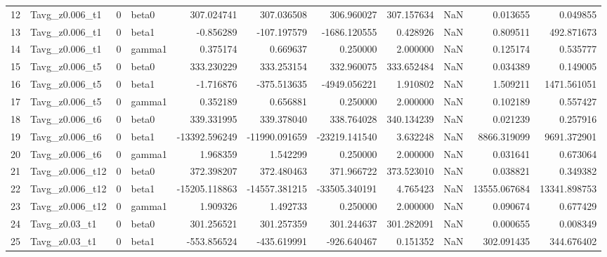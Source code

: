 \begin{tabular}{llrlrrrrrrr}
12 &    Tavg_z0.006_t1 &       0 &     beta0 &    307.024741 &    307.036508 &    306.960027 &   307.157634 &      NaN &      0.013655 &      0.049855 \\
13 &    Tavg_z0.006_t1 &       0 &     beta1 &     -0.856289 &   -107.197579 &  -1686.120555 &     0.428926 &      NaN &      0.809511 &    492.871673 \\
14 &    Tavg_z0.006_t1 &       0 &    gamma1 &      0.375174 &      0.669637 &      0.250000 &     2.000000 &      NaN &      0.125174 &      0.535777 \\
15 &    Tavg_z0.006_t5 &       0 &     beta0 &    333.230229 &    333.253154 &    332.960075 &   333.652484 &      NaN &      0.034389 &      0.149005 \\
16 &    Tavg_z0.006_t5 &       0 &     beta1 &     -1.716876 &   -375.513635 &  -4949.056221 &     1.910802 &      NaN &      1.509211 &   1471.561051 \\
17 &    Tavg_z0.006_t5 &       0 &    gamma1 &      0.352189 &      0.656881 &      0.250000 &     2.000000 &      NaN &      0.102189 &      0.557427 \\
18 &    Tavg_z0.006_t6 &       0 &     beta0 &    339.331995 &    339.378040 &    338.764028 &   340.134239 &      NaN &      0.021239 &      0.257916 \\
19 &    Tavg_z0.006_t6 &       0 &     beta1 & -13392.596249 & -11990.091659 & -23219.141540 &     3.632248 &      NaN &   8866.319099 &   9691.372901 \\
20 &    Tavg_z0.006_t6 &       0 &    gamma1 &      1.968359 &      1.542299 &      0.250000 &     2.000000 &      NaN &      0.031641 &      0.673064 \\
21 &   Tavg_z0.006_t12 &       0 &     beta0 &    372.398207 &    372.480463 &    371.966722 &   373.523010 &      NaN &      0.038821 &      0.349382 \\
22 &   Tavg_z0.006_t12 &       0 &     beta1 & -15205.118863 & -14557.381215 & -33505.340191 &     4.765423 &      NaN &  13555.067684 &  13341.898753 \\
23 &   Tavg_z0.006_t12 &       0 &    gamma1 &      1.909326 &      1.492733 &      0.250000 &     2.000000 &      NaN &      0.090674 &      0.677429 \\
24 &     Tavg_z0.03_t1 &       0 &     beta0 &    301.256521 &    301.257359 &    301.244637 &   301.282091 &      NaN &      0.000655 &      0.008349 \\
25 &     Tavg_z0.03_t1 &       0 &     beta1 &   -553.856524 &   -435.619991 &   -926.640467 &     0.151352 &      NaN &    302.091435 &    344.676402 \\

\end{tabular}
